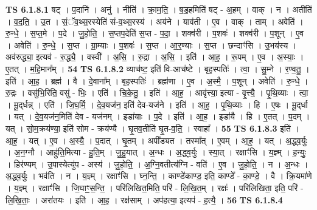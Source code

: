 \documentclass[17pt]{extarticle}
\begin{document}
                                \textbf{ TS 6.1.8.1} \newline
                  षट् । प॒दानि॑ । अनु॑ । नीति॑ । क्रा॒म॒ति॒ । ष॒ड॒हमिति॑ षट् - अ॒हम् । वाक् । न । अतीति॑ । व॒द॒ति॒ । उ॒त । सं॒ॅव॒थ्स॒रस्येति॑ सं-व॒थ्स॒रस्य॑ । अय॑ने । याव॑ती । ए॒व । वाक् । ताम् । अवेति॑ । रु॒न्धे॒ । स॒प्त॒मे । प॒दे । जु॒हो॒ति॒ । स॒प्तप॒देति॑ स॒प्त - प॒दा॒ । शक्व॑री । प॒शवः॑ । शक्व॑री । प॒शून् । ए॒व । अवेति॑ । रु॒न्धे॒ । स॒प्त । ग्रा॒म्याः । प॒शवः॑ । स॒प्त । आ॒र॒ण्याः । स॒प्त । छन्दाꣳ॑सि । उ॒भय॑स्य । अव॑रुद्ध्या॒ इत्यव॑ - रु॒द्ध्यै॒ । वस्वी᳚ । अ॒सि॒ । रु॒द्रा । अ॒सि॒ । इति॑ । आ॒ह॒ । रू॒पम् । ए॒व । अ॒स्याः॒ । ए॒तत् । म॒हि॒मान᳚म् । \textbf{  54} \newline
                  \newline
                                \textbf{ TS 6.1.8.2} \newline
                  व्याच॑ष्ट॒ इति॑ वि-आच॑ष्टे । बृह॒स्पतिः॑ । त्वा॒ । सु॒म्ने । र॒ण्व॒तु॒ । इति॑ । आ॒ह॒ । ब्रह्म॑ । वै । दे॒वाना᳚म् । बृह॒स्पतिः॑ । ब्रह्म॑णा । ए॒व । अ॒स्मै॒ । प॒शून् । अवेति॑ । रु॒न्धे॒ । रु॒द्रः । वसु॑भि॒रिति॒ वसु॑ - भिः॒ । एति॑ । चि॒के॒तु॒ । इति॑ । आ॒ह॒ । आवृ॑त्त्या॒ इत्या - वृ॒त्त्यै॒ । पृ॒थि॒व्याः । त्वा॒ । मू॒द्‌र्धन्न् । एति॑ । जि॒घ॒र्मि॒ । दे॒व॒यज॑न॒ इति॑ देव-यज॑ने । इति॑ । आ॒ह॒ । पृ॒थि॒व्याः । हि । ए॒षः । मू॒द्‌र्धा । यत् । दे॒व॒यज॑न॒मिति॑ देव - यज॑नम् । इडा॑याः । प॒दे । इति॑ । आ॒ह॒ । इडा॑यै । हि । ए॒तत् । प॒दम् । यत् । सो॒म॒क्रय॑ण्या॒ इति॑ सोम - क्रय॑ण्यै । घृ॒तव॒तीति॑ घृ॒त-व॒ति॒ । स्वाहा᳚ । \textbf{  55} \newline
                  \newline
                                \textbf{ TS 6.1.8.3} \newline
                  इति॑ । आ॒ह॒ । यत् । ए॒व । अ॒स्यै॒ । प॒दात् । घृ॒तम् । अपी᳚ड्यत । तस्मा᳚त् । ए॒वम् । आ॒ह॒ । यत् । अ॒द्ध्व॒र्युः । अ॒न॒ग्नौ । आहु॑ति॒मित्या - हु॒ति॒म् । जु॒हु॒यात् । अ॒न्धः । अ॒द्ध्व॒र्युः । स्या॒त् । रक्षाꣳ॑सि । य॒ज्ञ्म् । ह॒न्युः॒ । हिर॑ण्यम् । उ॒पास्येत्यु॑प - अस्य॑ । जु॒हो॒ति॒ । अ॒ग्नि॒वतीत्य॑ग्नि - वति॑ । ए॒व । जु॒हो॒ति॒ । न । अ॒न्धः । अ॒द्ध्व॒र्युः । भव॑ति । न । य॒ज्ञ्म् । रक्षाꣳ॑सि । घ्न॒न्ति॒ । काण्डे॑काण्ड॒ इति॒ काण्डे᳚ - का॒ण्डे॒ । वै । क्रि॒यमा॑णे । य॒ज्ञ्म् । रक्षाꣳ॑सि । जि॒घाꣳ॒॒स॒न्ति॒ । परि॑लिखित॒मिति॒ परि॑ - लि॒खि॒त॒म् । रक्षः॑ । परि॑लिखिता॒ इति॒ परि॑ - लि॒खि॒ताः॒ । अरा॑तयः । इति॑ । आ॒ह॒ । रक्ष॑साम् । अप॑हत्या॒ इत्यप॑ - ह॒त्यै॒ । \textbf{  56} \newline
                  \newline
                                \textbf{ TS 6.1.8.4} \newline
\end{document}
